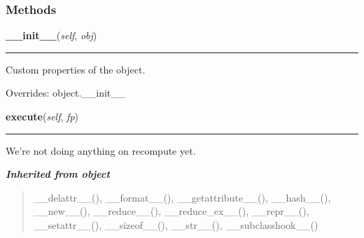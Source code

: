   \subsubsection{Methods}

    \vspace{0.5ex}

\hspace{.8\funcindent}\begin{boxedminipage}{\funcwidth}

    \raggedright \textbf{\_\_init\_\_}(\textit{self}, \textit{obj})

    \vspace{-1.5ex}

    \rule{\textwidth}{0.5\fboxrule}
\setlength{\parskip}{2ex}
    Custom properties of the object.

\setlength{\parskip}{1ex}
      Overrides: object.\_\_init\_\_

    \end{boxedminipage}

    \label{theia:rendering:features:FCObject:execute}

    \vspace{0.5ex}

\hspace{.8\funcindent}\begin{boxedminipage}{\funcwidth}

    \raggedright \textbf{execute}(\textit{self}, \textit{fp})

    \vspace{-1.5ex}

    \rule{\textwidth}{0.5\fboxrule}
\setlength{\parskip}{2ex}
    We're not doing anything on recompute yet.

\setlength{\parskip}{1ex}
    \end{boxedminipage}


\large{\textbf{\textit{Inherited from object}}}

\begin{quote}
\_\_delattr\_\_(), \_\_format\_\_(), \_\_getattribute\_\_(), \_\_hash\_\_(), \_\_new\_\_(), \_\_reduce\_\_(), \_\_reduce\_ex\_\_(), \_\_repr\_\_(), \_\_setattr\_\_(), \_\_sizeof\_\_(), \_\_str\_\_(), \_\_subclasshook\_\_()
\end{quote}

